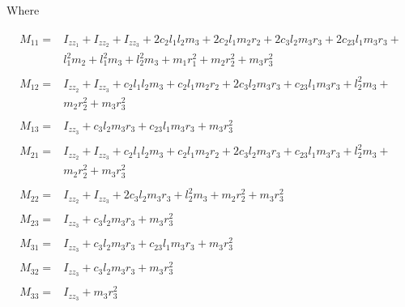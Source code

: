 Where

\begin{align}
    \begin{split}
        M_{11} =& I_{zz_1} + I_{zz_2} + I_{zz_3} + 2 c_{2} l_{1} l_{2} m_{3} + 2 c_{2} l_{1} m_{2} r_{2} + 2 c_{3} l_{2} m_{3} r_{3} + 2 c_{23} l_{1} m_{3} r_{3} + \\
            & l_{1}^{2} m_{2} + l_{1}^{2} m_{3} + l_{2}^{2} m_{3} + m_{1} r_{1}^{2} + m_{2} r_{2}^{2} + m_{3} r_{3}^{2}
    \end{split} \nonumber \\
    \begin{split}
        M_{12} =& I_{zz_2} + I_{zz_3} + c_{2} l_{1} l_{2} m_{3} + c_{2} l_{1} m_{2} r_{2} + 2 c_{3} l_{2} m_{3} r_{3} + c_{23} l_{1} m_{3} r_{3} + l_{2}^{2} m_{3} + \\
            & m_{2} r_{2}^{2} + m_{3} r_{3}^{2}
    \end{split} \nonumber \\
    \begin{split}
        M_{13} =& I_{zz_3} + c_{3} l_{2} m_{3} r_{3} + c_{23} l_{1} m_{3} r_{3} + m_{3} r_{3}^{2}
    \end{split}
    \label{eq:3r-dyn-mass-matrix-col1}
    \\
    \begin{split}
        M_{21} =& I_{zz_2} + I_{zz_3} + c_{2} l_{1} l_{2} m_{3} + c_{2} l_{1} m_{2} r_{2} + 2 c_{3} l_{2} m_{3} r_{3} + c_{23} l_{1} m_{3} r_{3} + l_{2}^{2} m_{3} + \\
            & m_{2} r_{2}^{2} + m_{3} r_{3}^{2}
    \end{split} \nonumber \\
    \begin{split}
        M_{22} =& I_{zz_2} + I_{zz_3} + 2 c_{3} l_{2} m_{3} r_{3} + l_{2}^{2} m_{3} + m_{2} r_{2}^{2} + m_{3} r_{3}^{2}
    \end{split} \nonumber \\
    \begin{split}
        M_{23} =& I_{zz_3} + c_{3} l_{2} m_{3} r_{3} + m_{3} r_{3}^{2}
    \end{split}
    \label{eq:3r-dyn-mass-matrix-col2}
    \\
    \begin{split}
        M_{31} =& I_{zz_3} + c_{3} l_{2} m_{3} r_{3} + c_{23} l_{1} m_{3} r_{3} + m_{3} r_{3}^{2}
    \end{split} \nonumber \\
    \begin{split}
        M_{32} =& I_{zz_3} + c_{3} l_{2} m_{3} r_{3} + m_{3} r_{3}^{2}
    \end{split} \nonumber \\
    \begin{split}
        M_{33} =& I_{zz_3} + m_{3} r_{3}^{2}
    \end{split}
    \label{eq:3r-dyn-mass-matrix-col3}
\end{align}

